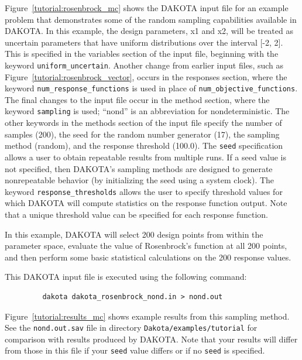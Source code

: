 Figure~\ref{tutorial:rosenbrock_mc} shows the DAKOTA input file for
an example problem that demonstrates some of the random sampling
capabilities available in DAKOTA. In this example, the design
parameters, x1 and x2, will be treated as uncertain parameters that
have uniform distributions over the interval [-2, 2]. This is
specified in the variables section of the input file, beginning with
the keyword \texttt{uniform\_uncertain}.
Another change from earlier input files, such as
Figure~\ref{tutorial:rosenbrock_vector},
occurs in the responses section, where
the keyword \texttt{num\_response\_functions} is used in place of
\texttt{num\_objective\_functions}. The final changes to the input
file occur in the method section, where the keyword
\texttt{sampling} is used; ``nond'' is an abbreviation for 
nondeterministic.
The other keywords in the methods section of the input file
specify the number of samples (200), the seed for the random number
generator (17), the sampling method (random), and the response
threshold (100.0). The \texttt{seed} specification allows a user to
obtain repeatable results from multiple runs. If a seed value is not
specified, then DAKOTA's sampling methods are designed to generate
nonrepeatable behavior (by initializing the seed using a system
clock). The keyword \texttt{response\_thresholds} allows the user to
specify threshold values for which DAKOTA will compute statistics on
the response function output.  Note that a unique threshold value can
be specified for each response function.

In this example, DAKOTA will select 200 design points from within the
parameter space, evaluate the value of Rosenbrock's function at all
200 points, and then perform some basic statistical calculations on
the 200 response values.

This DAKOTA input file is executed using the following command:
\begin{small}
\begin{verbatim}
         dakota dakota_rosenbrock_nond.in > nond.out
\end{verbatim}
\end{small}

Figure~\ref{tutorial:results_mc} shows example results from this 
sampling method.  See the \texttt{nond.out.sav} file in directory
\texttt{Dakota/examples/tutorial} for comparison with results
produced by DAKOTA. Note that your results will differ from those in
this file if your \texttt{seed} value differs or if no \texttt{seed}
is specified.



